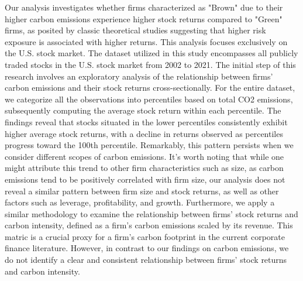 \documentclass[12pt]{article}
\begin{document}
Our analysis investigates whether firms characterized as "Brown" due to their higher carbon emissions experience higher stock returns compared to "Green" firms, as posited by classic theoretical studies suggesting that higher risk exposure is associated with higher returns. This analysis focuses exclusively on the U.S. stock market. The dataset utilized in this study encompasses all publicly traded stocks in the U.S. stock market from 2002 to 2021. The initial step of this research involves an exploratory analysis of the relationship between firms' carbon emissions and their stock returns cross-sectionally. For the entire dataset, we categorize all the observations into percentiles based on total CO2 emissions, subsequently computing the average stock return within each percentile. The findings reveal that stocks situated in the lower percentiles consistently exhibit higher average stock returns, with a decline in returns observed as percentiles progress toward the 100th percentile. Remarkably, this pattern persists when we consider different scopes of carbon emissions. It's worth noting that while one might attribute this trend to other firm characteristics such as size, as carbon emissions tend to be positively correlated with firm size, our analysis does not reveal a similar pattern between firm size and stock returns, as well as other factors such as leverage, profitability, and growth. Furthermore, we apply a similar methodology to examine the relationship between firms' stock returns and carbon intensity, defined as a firm's carbon emissions scaled by its revenue. This matric is a crucial proxy for a firm's carbon footprint in the current corporate finance literature. However, in contrast to our findings on carbon emissions, we do not identify a clear and consistent relationship between firms' stock returns and carbon intensity.
\end{document}

